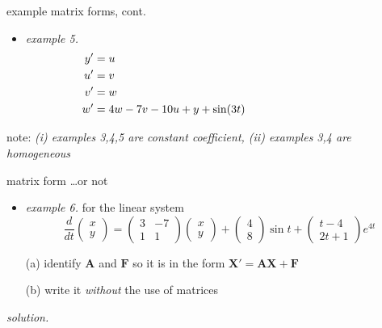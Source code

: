 \documentclass[dvipsnames,colorlinks]{beamer}
\newcommand{\bA}{\mathbf{A}}
\newcommand{\bF}{\mathbf{F}}
\newcommand{\bX}{\mathbf{X}}
\begin{document}
\begin{frame}{example matrix forms, cont.}

\small
\begin{itemize}
\item \emph{example 5.}
\begin{align*}
y' &= u \hspace{75mm} \\
u' &= v \\
v' &= w \\
w' &= 4w-7v-10u+y+\sin(3t)
\end{align*}
\end{itemize}

\vspace{30mm}
\scriptsize note: \emph{(i) examples 3,4,5 are constant coefficient, (ii) examples 3,4 are homogeneous}
\end{frame}


\begin{frame}{matrix form \dots or not}

\begin{itemize}
\item \emph{example 6.}  for the linear system
    $$\frac{d}{dt} \begin{pmatrix} x \\ y \end{pmatrix} =  \begin{pmatrix} 3 & -7 \\ 1 & 1 \end{pmatrix} \begin{pmatrix} x \\ y \end{pmatrix} + \begin{pmatrix} 4 \\ 8 \end{pmatrix} \sin t + \begin{pmatrix} t-4 \\ 2t+1 \end{pmatrix} e^{4t}$$

(a) identify $\bA$ and $\bF$ so it is in the form $\bX'=\bA\bX+\bF$

(b) write it \emph{without} the use of matrices
\end{itemize}

\noindent \emph{solution.}

\vspace{50mm}
\end{frame}
\end{document}
